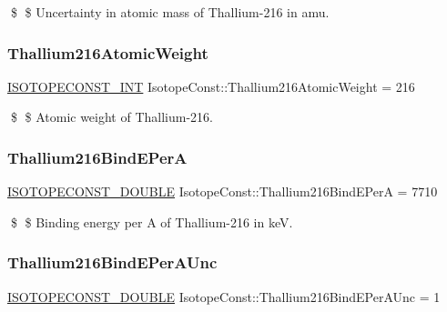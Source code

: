 \$ \$ Uncertainty in atomic mass of Thallium-\/216 in amu. \mbox{\label{group___isotope_const-_thallium-_tl216_gaf72a1752d6f1697c224fa84208f61983}} 
\subsubsection{\texorpdfstring{Thallium216\+Atomic\+Weight}{Thallium216AtomicWeight}}
{\footnotesize\ttfamily \mbox{\hyperlink{group___isotope_const-_macros_ga5f18360b3e99483a35c32d789e62621c}{I\+S\+O\+T\+O\+P\+E\+C\+O\+N\+S\+T\+\_\+\+I\+NT}} Isotope\+Const\+::\+Thallium216\+Atomic\+Weight = 216}

\$ \$ Atomic weight of Thallium-\/216. \mbox{\label{group___isotope_const-_thallium-_tl216_ga4ec81d266cba43fabb965760b986ef52}} 
\subsubsection{\texorpdfstring{Thallium216\+Bind\+E\+PerA}{Thallium216BindEPerA}}
{\footnotesize\ttfamily \mbox{\hyperlink{group___isotope_const-_macros_ga8f45a7272ce02c0b4c65c44636ed719a}{I\+S\+O\+T\+O\+P\+E\+C\+O\+N\+S\+T\+\_\+\+D\+O\+U\+B\+LE}} Isotope\+Const\+::\+Thallium216\+Bind\+E\+PerA = 7710}

\$ \$ Binding energy per A of Thallium-\/216 in keV. \mbox{\label{group___isotope_const-_thallium-_tl216_ga1c4a390884ec405cb521a7b085ed52ef}} 
\subsubsection{\texorpdfstring{Thallium216\+Bind\+E\+Per\+A\+Unc}{Thallium216BindEPerAUnc}}
{\footnotesize\ttfamily \mbox{\hyperlink{group___isotope_const-_macros_ga8f45a7272ce02c0b4c65c44636ed719a}{I\+S\+O\+T\+O\+P\+E\+C\+O\+N\+S\+T\+\_\+\+D\+O\+U\+B\+LE}} Isotope\+Const\+::\+Thallium216\+Bind\+E\+Per\+A\+Unc = 1}

